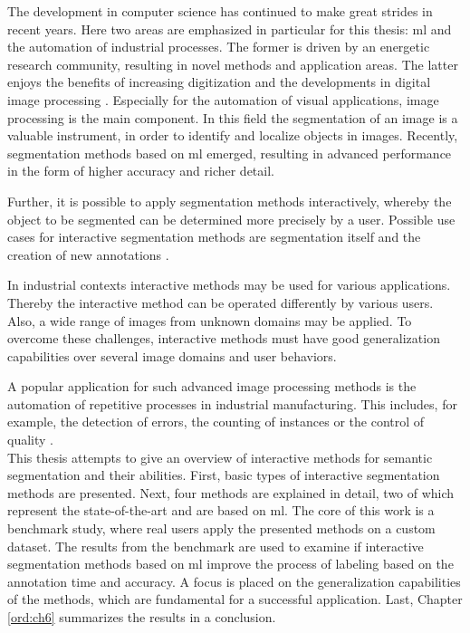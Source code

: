 

The development in computer science has continued to make great strides in recent years. 
Here two areas are emphasized in particular for this thesis: \gls{ml} and the automation of industrial processes.
The former is driven by an energetic research community, resulting in novel methods and application areas.
The latter enjoys the benefits of increasing digitization and the developments in digital image processing \cite{Rah19-IoT}.
Especially for the automation of visual applications, image processing is the main component.
In this field the segmentation of an image is a valuable instrument, in order to identify and localize objects in images.
Recently, segmentation methods based on \gls{ml} emerged, resulting in advanced performance in the form of higher accuracy and richer detail.

Further, it is possible to apply segmentation methods interactively, whereby the object to be segmented can be determined more precisely by a user.
Possible use cases for interactive segmentation methods are segmentation itself and the creation of new annotations \cite{Man18-DEXTR}.

In industrial contexts interactive methods may be used for various applications.
Thereby the interactive method can be operated differently by various users.
Also, a wide range of images from unknown domains may be applied. 
To overcome these challenges, interactive methods must have good generalization capabilities over several image domains and user behaviors.

A popular application for such advanced image processing methods is the automation of repetitive processes in industrial manufacturing.
This includes, for example, the detection of errors, the counting of instances or the control of quality \cite{Chen19-AnomalyDetectionManufacturing}.
\\
\newline
This thesis attempts to give an overview of interactive methods for semantic segmentation and their abilities.
First, basic types of interactive segmentation methods are presented.
Next, four methods are explained in detail, two of which represent the state-of-the-art and are based on \gls{ml}.
The core of this work is a benchmark study, where real users apply the presented methods on a custom dataset.
The results from the benchmark are used to examine if interactive segmentation methods based on \gls{ml} improve the process of labeling based on the annotation time and accuracy.
A focus is placed on the generalization capabilities of the methods, which are fundamental for a successful application.
Last, Chapter \ref{ord:ch6} summarizes the results in a conclusion.



